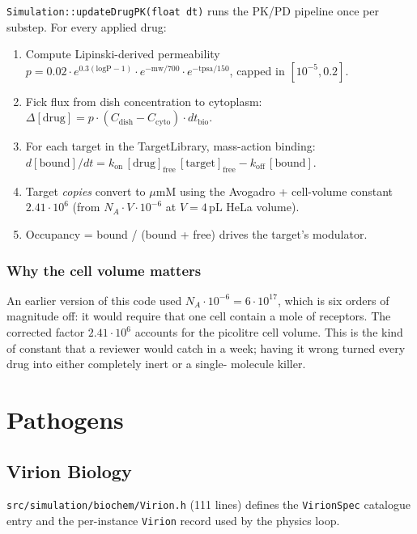 \documentclass[11pt,letterpaper,twoside,openany]{book}
\newcommand{\code}[1]{\texttt{#1}}
\newcommand{\file}[1]{\texttt{\small#1}}
\newcommand{\um}{\ensuremath{\mu\text{m}}}
\begin{document}
\code{Simulation::updateDrugPK(float dt)} runs the PK/PD pipeline
once per substep. For every applied drug:
\begin{enumerate}
  \item Compute Lipinski-derived permeability
        \(p = 0.02 \cdot e^{0.3 (\text{logP}-1)} \cdot e^{-\text{mw}/700} \cdot e^{-\text{tpsa}/150}\),
        capped in $[10^{-5}, 0.2]$.
  \item Fick flux from dish concentration to cytoplasm:
        \(\Delta[\text{drug}] = p \cdot (C_\text{dish} - C_\text{cyto}) \cdot dt_\text{bio}\).
  \item For each target in the TargetLibrary, mass-action binding:
        \(d[\text{bound}]/dt = k_\text{on}\,[\text{drug}]_\text{free}\,[\text{target}]_\text{free} - k_\text{off}\,[\text{bound}]\).
  \item Target \emph{copies} convert to \um M using the Avogadro +
        cell-volume constant $2.41\cdot 10^{6}$ (from
        $N_A \cdot V \cdot 10^{-6}$ at $V = 4\,\text{pL}$ HeLa volume).
  \item Occupancy = bound / (bound + free) drives the target's
        modulator.
\end{enumerate}

\section{Why the cell volume matters}

An earlier version of this code used $N_A \cdot 10^{-6} = 6 \cdot
10^{17}$, which is six orders of magnitude off: it would require
that one cell contain a mole of receptors. The corrected factor
$2.41 \cdot 10^6$ accounts for the picolitre cell volume. This is
the kind of constant that a reviewer would catch in a week; having
it wrong turned every drug into either completely inert or a single-
molecule killer.

\part{Pathogens}

\chapter{Virion Biology}
\label{ch:virion}

\file{src/simulation/biochem/Virion.h} (111 lines) defines the
\code{VirionSpec} catalogue entry and the per-instance
\code{Virion} record used by the physics loop.
\end{document}
